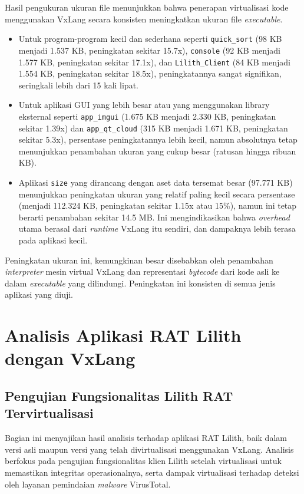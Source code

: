 Hasil pengukuran ukuran file menunjukkan bahwa penerapan virtualisasi kode menggunakan VxLang secara konsisten meningkatkan ukuran file \textit{executable}.
\begin{itemize}
    \item Untuk program-program kecil dan sederhana seperti \texttt{quick\_sort} (98 KB menjadi 1.537 KB, peningkatan sekitar 15.7x), \texttt{console} (92 KB menjadi 1.577 KB, peningkatan sekitar 17.1x), dan \texttt{Lilith\_Client} (84 KB menjadi 1.554 KB, peningkatan sekitar 18.5x), peningkatannya sangat signifikan, seringkali lebih dari 15 kali lipat.
    \item Untuk aplikasi GUI yang lebih besar atau yang menggunakan library eksternal seperti \texttt{app\_imgui} (1.675 KB menjadi 2.330 KB, peningkatan sekitar 1.39x) dan \texttt{app\_qt\_cloud} (315 KB menjadi 1.671 KB, peningkatan sekitar 5.3x), persentase peningkatannya lebih kecil, namun absolutnya tetap menunjukkan penambahan ukuran yang cukup besar (ratusan hingga ribuan KB).
    \item Aplikasi \texttt{size} yang dirancang dengan aset data tersemat besar (97.771 KB) menunjukkan peningkatan ukuran yang relatif paling kecil secara persentase (menjadi 112.324 KB, peningkatan sekitar 1.15x atau 15\%), namun ini tetap berarti penambahan sekitar 14.5 MB. Ini mengindikasikan bahwa \textit{overhead} utama berasal dari \textit{runtime} VxLang itu sendiri, dan dampaknya lebih terasa pada aplikasi kecil.
\end{itemize}
Peningkatan ukuran ini, kemungkinan besar disebabkan oleh penambahan \textit{interpreter} mesin virtual VxLang dan representasi \textit{bytecode} dari kode asli ke dalam \textit{executable} yang dilindungi. Peningkatan ini konsisten di semua jenis aplikasi yang diuji.

\section{Analisis Aplikasi RAT Lilith dengan VxLang}
\label{bab:hasil_penelitian_lilith} 

\subsection{Pengujian Fungsionalitas Lilith RAT Tervirtualisasi}
\label{subsec:fungsionalitas_lilith_virtualized}
Bagian ini menyajikan hasil analisis terhadap aplikasi RAT Lilith, baik dalam versi asli maupun versi yang telah divirtualisasi menggunakan VxLang. Analisis berfokus pada pengujian fungsionalitas klien Lilith setelah virtualisasi untuk memastikan integritas operasionalnya, serta dampak virtualisasi terhadap deteksi oleh layanan pemindaian \textit{malware} VirusTotal.

